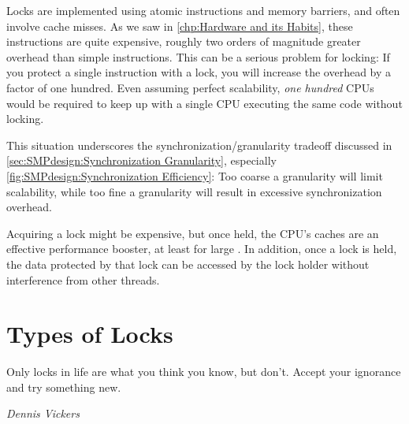 Locks are implemented using atomic instructions and memory barriers,
and often involve cache misses.
As we saw in \cref{chp:Hardware and its Habits},
these instructions are quite expensive, roughly two
orders of magnitude greater overhead than simple instructions.
This can be a serious problem for locking: If you protect a single
instruction with a lock, you will increase the overhead by a factor
of one hundred.
Even assuming perfect scalability, \emph{one hundred} CPUs would
be required to keep up with a single CPU executing the same code
without locking.

This situation underscores the synchronization\-/granularity
tradeoff discussed in \cref{sec:SMPdesign:Synchronization Granularity},
especially \cref{fig:SMPdesign:Synchronization Efficiency}:
Too coarse a granularity will limit scalability, while too fine a
granularity will result in excessive synchronization overhead.

Acquiring a lock might be expensive, but once held, the CPU's caches
are an effective performance booster, at least for large .
In addition, once a lock is held, the data protected by that lock can
be accessed by the lock holder without interference from other threads.

\QuickQuizEnd

\section{Types of Locks}
\label{sec:locking:Types of Locks}
%
\epigraph{Only locks in life are what you think you know, but don't.
	  Accept your ignorance and try something new.}
	 {\emph{Dennis Vickers}}

